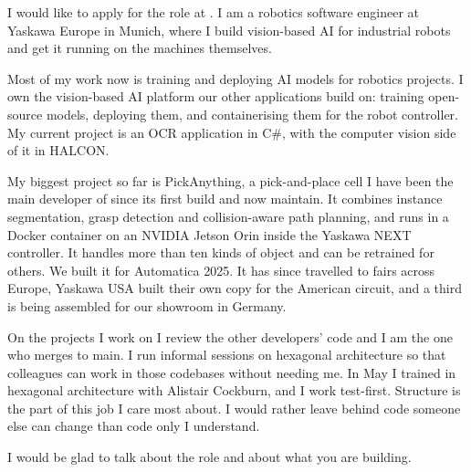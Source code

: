 I would like to apply for the \position{} role at \company. I am a robotics software
engineer at Yaskawa Europe in Munich, where I build vision-based AI for industrial
robots and get it running on the machines themselves.

Most of my work now is training and deploying AI models for robotics projects. I
own the vision-based AI platform our other applications build on: training
open-source models, deploying them, and containerising them for the robot
controller. My current project is an OCR application in C\#, with the computer
vision side of it in HALCON.

My biggest project so far is PickAnything, a pick-and-place cell I have been the
main developer of since its first build and now maintain. It combines instance
segmentation, grasp detection and collision-aware path planning, and runs in a
Docker container on an NVIDIA Jetson Orin inside the Yaskawa NEXT controller. It
handles more than ten kinds of object and can be retrained for others. We built it
for Automatica 2025. It has since travelled to fairs across Europe, Yaskawa USA
built their own copy for the American circuit, and a third is being assembled for
our showroom in Germany.

On the projects I work on I review the other developers' code and I am the one who
merges to main. I run informal sessions on hexagonal architecture so that
colleagues can work in those codebases without needing me. In May I trained in
hexagonal architecture with Alistair Cockburn, and I work test-first.
Structure is the part of this job I care most about. I would rather leave behind
code someone else can change than code only I understand.

\ifdefempty{\whyfit}{}{\whyfit}

I would be glad to talk about the role and about what you are building.
